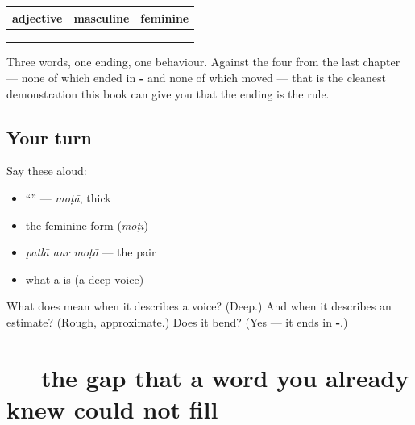 \begin{grammarlens}[title={Grammar Lens: all three of them, and the rule holds}]
\noindent
\begin{tabularx}{\linewidth}{@{}>{\raggedright\arraybackslash}X>{\raggedright\arraybackslash}X>{\raggedright\arraybackslash}X@{}}
\toprule
\textbf{adjective} & \textbf{masculine} & \textbf{feminine} \\
\midrule
\hi{लंबा} & \hi{लंबा} & \hi{लंबी} \\
\hi{पतला} & \hi{पतला} & \hi{पतली} \\
\hi{मोटा} & \hi{मोटा} & \hi{मोटी} \\
\bottomrule
\end{tabularx}

Three words, one ending, one behaviour. Against the four from the last chapter — none of which ended in \textbf{-} and none of which moved — that is the cleanest demonstration this book can give you that the ending is the rule.
\end{grammarlens}

\subsection*{Your turn}
Say these aloud:

\begin{itemize}
\raggedright
  \item \textquotedblleft{}\textquotedblright{} — \emph{moṭā}, thick
  \item the feminine form (\emph{moṭī})
  \item \emph{patlā aur moṭā} — the pair
  \item what a \textbf{ } is (a deep voice)
\end{itemize}

\begin{tcolorbox}[breakable,colback=teal!4,colframe=teal!35!black,title={Before you move on}]
What does \textbf{} mean when it describes a voice? (Deep.) And when it describes an estimate? (Rough, approximate.) Does it bend? (Yes — it ends in \textbf{-}.)
\end{tcolorbox}
\section[\texorpdfstring{\hi{नाटा} (nāṭā)}{नाटा (nāṭā)}]{ — the gap that a word you already knew could not fill}

\label{lesson:HI-C82-naataa}



